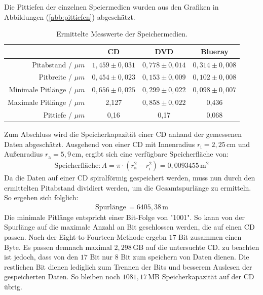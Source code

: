 Die Pittiefen der einzelnen Speiermedien wurden aus den Grafiken in Abbildungen (\ref{abb:pittiefen}) abgesch\"atzt.
\begin{table}
	\centering
	\caption{Ermittelte Messwerte der Speichermedien.}
\begin{tabular}{|r|ccc|}
	\hline
	{} & {CD} & {DVD} & {Blueray} \\
	\hline
	Pitabstand / $\mu m$ & $1,459 \pm 0,031$ & $0,778 \pm 0,014$ & $0,314 \pm 0,008$ \\
	Pitbreite	/ $\mu m$ &	$0,454 \pm 0,023$ & $0,153 \pm 0,009$ & $0,102 \pm 0,008$ \\
	Minimale Pitlänge / $\mu m$ & $0,656 \pm 0,025$ & $0,299 \pm 0,022$ & $0,098 \pm 0,007$ \\
	Maximale Pitlänge / $\mu m$ & 2,127 & $0,858 \pm 0,022$ & 0,436 \\
	Pittiefe / $\mu m$ & 0,16 & 0,17 & 0,068 \\
	\hline
\end{tabular}
\label{tab:auf2}
\end{table}
Zum Abschluss wird die Speicherkapazit\"at einer CD anhand der gemessenen Daten abgesch\"atzt.
Ausgehend von einer CD mit Innenradius $r_{\text{i}} = 2,25 \, \text{cm}$ und Au{\ss}enradius $r_{\text{a}} = 5,9 \, \text{cm}$, ergibt sich eine verf\"ugbare Speicherfl\"ache von:
\begin{align*}
	\text{Speicherfl\"ache:} \, A = \pi \cdot \left( r_{\text{a}}^2 - r_{\text{i}}^2 \right) = 0,0093455 \, \text{m}^2
\end{align*}
Da die Daten auf einer CD spiralf\"ormig gespeichert werden, muss nun durch den ermittelten Pitabstand dividiert werden, um die Gesamtspurl\"ange zu ermitteln.
So ergeben sich folglich:
\begin{align*}
	\text{Spurl\"ange} \, = 6405,38 \, \text{m}
\end{align*}
Die minimale Pitl\"ange entspricht einer Bit-Folge von "1001".
So kann von der Spurl\"ange auf die maximale Anzahl an Bit geschlossen werden, die auf einen CD passen.
Nach der Eight-to-Fourteen-Methode ergebn $17$ Bit zusammen einen Byte.
Es passen demnach maximal $2,298 \,$GB auf die untersuchte CD.
zu beachten ist jedoch, dass von den $17$ Bit nur $8$ Bit zum speichern von Daten dienen.
Die restlichen Bit dienen lediglich zum Trennen  der Bits und besserem Auslesen der gespeicherten Daten.
So bleiben noch $1081,17 \,$MB Speicherkapazit\"at auf der CD \"ubrig.

